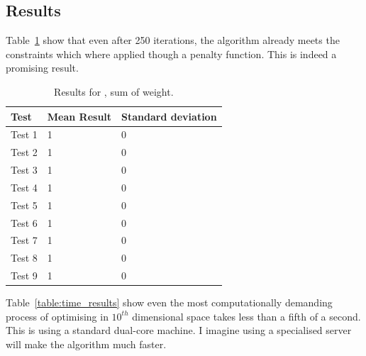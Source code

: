 \documentclass{pdfmx4020}
\begin{document}
    \subsection{Results} %
    \label{sub:results}
      Table~\ref{table:sum_weight_results} show that even after 250 iterations, the algorithm already meets the constraints which where applied though a penalty function. This is indeed a promising result.
        \begin{table}[H]
          \setlength{\extrarowheight}{2.0pt}
          \begin{tabular}{|l|l|l|}
            \hline
            Test & Mean Result & Standard deviation \\
            \hline
            Test 1 & 1 & 0 \\
            \hline
            Test 2 & 1 & 0 \\
            \hline
            Test 3 & 1 & 0 \\
            \hline
            Test 4 & 1 & 0 \\
            \hline
            Test 5 & 1 & 0 \\
            \hline
            Test 6 & 1 & 0 \\
            \hline
            Test 7 & 1 & 0 \\
            \hline
            Test 8 & 1 & 0 \\
            \hline
            Test 9 & 1 & 0 \\
            \hline
          \end{tabular}
          \caption{Results for , sum of weight.}
          \label{table:sum_weight_results}
        \end{table}
      Table~\ref{table:time_results} show even the most computationally demanding process of optimising in $10^{th}$ dimensional space takes less than a fifth of a second. This is using a standard dual-core machine. I imagine using a specialised server will make the algorithm much faster. 
\end{document}
